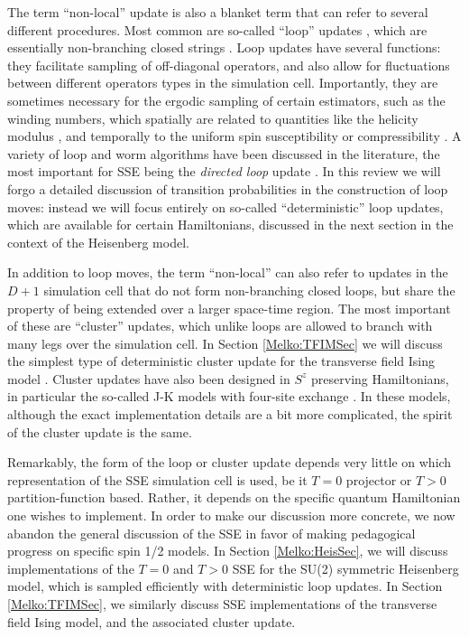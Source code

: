 \documentclass[vecphys]{svmult}
\begin{document}
The term ``non-local'' update is also a blanket term that can refer to several different procedures.  Most common are so-called ``loop'' updates \cite{Melko:Evertz93},
which are essentially non-branching closed strings \cite{Melko:Sandvik99}.  Loop updates have several functions: they facilitate sampling of off-diagonal operators, and also allow for fluctuations between different operators types in the simulation cell.  Importantly, they are sometimes necessary for the ergodic sampling of certain estimators, such as the winding numbers, which spatially are related to quantities like the helicity modulus \cite{Melko:PC}, and temporally to the uniform spin susceptibility or compressibility \cite{Melko:HGEloop}.  A variety of loop and worm algorithms have been discussed in the literature, the most important for SSE being the {\em directed loop} update \cite{Melko:Syljuasen02}.  In this review we will forgo a detailed discussion of transition probabilities in the construction of loop moves: instead we will focus entirely on so-called ``deterministic'' loop updates, which are available for certain Hamiltonians, discussed in the next section in the context of the Heisenberg model.  

In addition to loop moves, the term ``non-local'' can also refer to updates in the $D+1$ simulation cell that do not form non-branching closed loops, but share the property of being extended over a larger space-time region.  The most important of these are ``cluster'' updates,
which unlike loops are allowed to branch with many legs over the simulation cell.
In  Section \ref{Melko:TFIMSec} we will discuss the simplest type of deterministic cluster update for the transverse field Ising model \cite{Melko:Sandvik03}.  Cluster updates have also been designed in $S^z$ preserving Hamiltonians, in particular the so-called J-K models with four-site exchange \cite{Melko:JKqmc}.  In these models, although the exact implementation details are a bit more complicated, the spirit of the cluster update is the same.

Remarkably, the form of the loop or cluster update depends very little on which representation of the SSE simulation cell is used, be it $T=0$ projector or $T>0$ partition-function based.  Rather, it depends on the specific quantum Hamiltonian one wishes to implement.  In order to make our discussion more concrete, we now abandon the general discussion of the SSE in favor of making pedagogical progress on specific spin 1/2 models.  In Section  \ref{Melko:HeisSec}, we will discuss implementations of the $T=0$ and $T>0$ SSE for the SU(2) symmetric Heisenberg model, which is sampled efficiently with deterministic loop updates.  In Section  \ref{Melko:TFIMSec}, we similarly discuss SSE implementations of the transverse field Ising model, and the associated cluster update.
\end{document}
